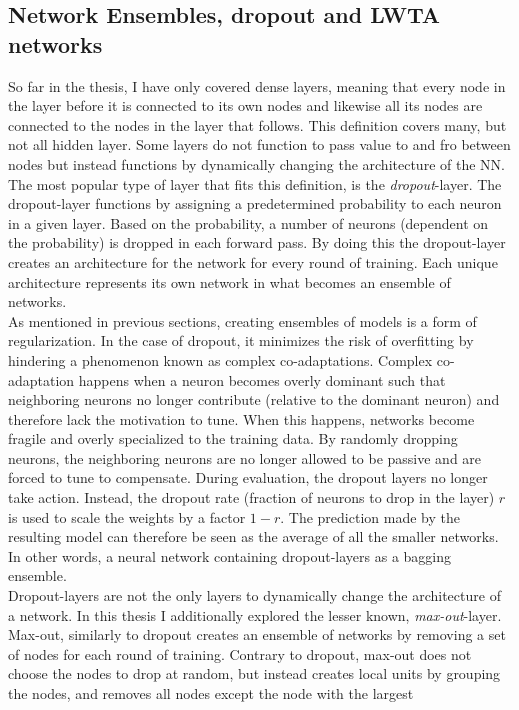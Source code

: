 \subsection{Network Ensembles, dropout and LWTA networks}
So far in the thesis, I have only covered dense layers, meaning that every node in the layer before it is 
connected to its own nodes and likewise all its nodes are connected to the nodes in the layer that follows. 
This definition covers many, but not all hidden layer. Some layers do not function to pass value to and 
fro between nodes but instead functions by dynamically changing the architecture of the \ac{NN}. The most popular 
type of layer that fits this definition, is the \emph{dropout}-layer. The dropout-layer functions by assigning a predetermined 
probability to each neuron in a given layer. Based on the probability, a number of neurons (dependent on the probability) 
is dropped in each forward pass. By doing this the dropout-layer creates an architecture for the network for every round
of training. Each unique architecture represents its own network in what becomes an ensemble of networks. 
\\
As mentioned in previous sections, creating ensembles of models is a form of regularization. In the case of 
dropout, it minimizes the risk of overfitting by hindering a phenomenon known as complex co-adaptations. Complex
co-adaptation happens when a neuron becomes overly dominant such that neighboring neurons no longer contribute (relative
to the dominant neuron) and therefore lack the motivation to tune. When this happens, networks become fragile and overly 
specialized to the training data. By randomly dropping neurons, the neighboring neurons are no longer allowed to be passive 
and are forced to tune to compensate. During evaluation, the dropout layers no longer take action. Instead, the dropout rate 
(fraction of neurons to drop in the layer) $r$ is used to scale the weights by a factor $1-r$. The prediction made by the resulting 
model can therefore be seen as the average of all the smaller networks. In other words, a neural network containing dropout-layers 
as a bagging ensemble. 
\\
Dropout-layers are not the only layers to dynamically change the architecture of a network. In this thesis I additionally 
explored the lesser known, \emph{max-out}-layer. Max-out, similarly to dropout creates an ensemble of networks by removing a set 
of nodes for each round of training. Contrary to dropout, max-out does not choose the nodes to drop at random,
but instead creates local units by grouping the nodes, and removes all nodes except the node with the largest
